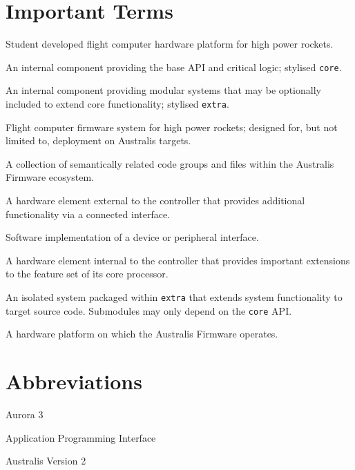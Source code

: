 \pagestyle{ruled}

\section*{Important Terms}
\begin{description}[leftmargin=8em,style=multiline]
    \item[Australis] Student developed flight computer hardware platform for high power rockets.
    \item[Australis Core] An internal component providing the base API and critical logic; stylised \verb|core|.
    \item[Australis Extra] An internal component providing modular systems that may be optionally included to extend core functionality; stylised \verb|extra|.
    \item[Australis Firmware] Flight computer firmware system for high power rockets; designed for, but not limited to, deployment on Australis targets.
    \item[Component] A collection of semantically related code groups and files within the Australis Firmware ecosystem.
    \item[Device] A hardware element external to the controller that provides additional functionality via a connected interface.
    \item[Driver] Software implementation of a device or peripheral interface.
    \item[Peripheral] A hardware element internal to the controller that provides important extensions to the feature set of its core processor.
    \item[Submodule] An isolated system packaged within \verb|extra| that extends system functionality to target source code. Submodules may only depend on the \verb|core| API.
    \item[Target] A hardware platform on which the Australis Firmware operates.
\end{description}

\section*{Abbreviations}
\begin{description}[leftmargin=3em,style=multiline]
    \item[A3\footnotemark] Aurora 3
    \item[API] Application Programming Interface
    \item[AV2] Australis Version 2
\end{description}

